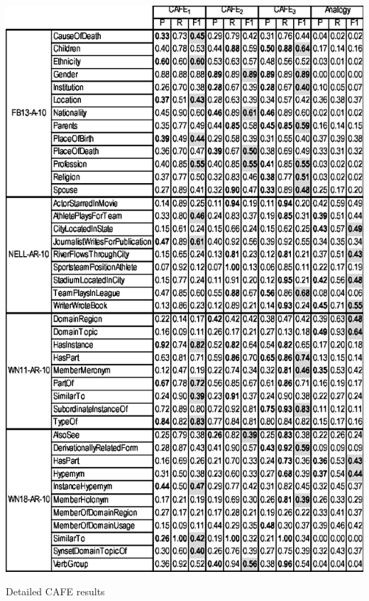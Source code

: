 \newpage
\clearpage

\begin{table}[H]
    \centering
    \includegraphics[height=0.8\paperheight,right]{fig/cafe/table-cafe-left}%
    \caption{Detailed CAFE results}
    \label{fig:cafe-table-results}
\end{table}  
